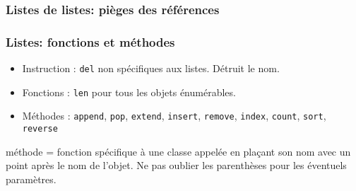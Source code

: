 \begin{frame}
  \frametitle{Listes de listes: pièges des références}
  
\end{frame}

\begin{frame}
  \frametitle{Listes: fonctions et méthodes}
  \begin{itemize}
    \item Instruction : \texttt{del} non spécifiques aux listes. Détruit le nom.
    \item Fonctions : \texttt{len} pour tous les objets énumérables.
    \item Méthodes : \texttt{append}, \texttt{pop},   \texttt{extend}, \texttt{insert}, \texttt{remove}, \texttt{index}, \texttt{count}, \texttt{sort}, \texttt{reverse}
  \end{itemize}
  méthode = fonction spécifique à une classe\newline
  appelée en plaçant son nom avec un point après le nom de l'objet. Ne pas oublier les parenthèses pour les éventuels paramètres.
\end{frame}


